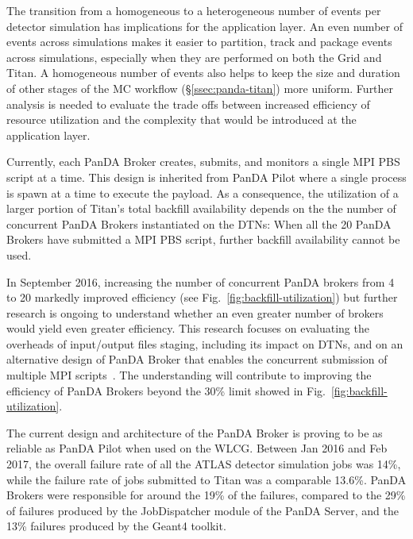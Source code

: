 The transition from a homogeneous to a heterogeneous number of events per
detector simulation has implications for the application layer. An even
number of events across simulations makes it easier to partition, track and
package events across simulations, especially when they are performed on both
the Grid and Titan. A homogeneous number of events also helps to keep the
size and duration of other stages of the MC workflow
(\S\ref{ssec:panda-titan}) more uniform. Further analysis is needed to
evaluate the trade offs between increased efficiency of resource utilization
and the complexity that would be introduced at the application layer.

Currently, each PanDA Broker creates, submits, and monitors a single MPI PBS
script at a time. This design is inherited from PanDA Pilot where a single
process is spawn at a time to execute the payload. As a consequence, the
utilization of a larger portion of Titan's total backfill availability
depends on the the number of concurrent PanDA Brokers instantiated on the
DTNs: When all the 20 PanDA Brokers have submitted a MPI PBS script, further
backfill availability cannot be used.

In September 2016, increasing the number of concurrent PanDA brokers from 4
to 20 markedly improved efficiency (see Fig.~\ref{fig:backfill-utilization})
but further research is ongoing to understand whether an even greater
number of brokers would yield even greater efficiency. This research focuses on
evaluating the overheads of input/output files staging, including its impact
on DTNs, and on an alternative design of PanDA Broker that enables the
concurrent submission of multiple MPI scripts~\cite{barreiro2016panda}. The
understanding will contribute to improving the efficiency of
PanDA Brokers beyond the 30\% limit showed in
Fig.~\ref{fig:backfill-utilization}.

The current design and architecture of the PanDA Broker is proving to be as
reliable as PanDA Pilot when used on the WLCG\@. Between Jan 2016 and Feb
2017, the overall failure rate of all the ATLAS detector simulation jobs was
14\%, while the failure rate of jobs submitted to Titan was a comparable
13.6\%. PanDA Brokers were responsible for around the 19\% of the failures,
compared to the 29\% of failures produced by the JobDispatcher module of the
PanDA Server, and the 13\% failures produced by the Geant4 toolkit. 


